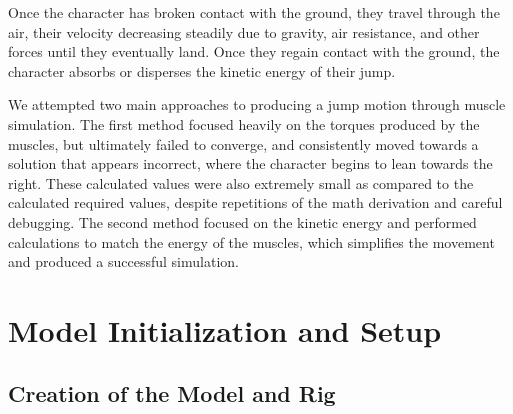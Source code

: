 Once the character has broken contact with the ground, they travel through the air, their velocity decreasing steadily due to gravity, air resistance, and other forces until they eventually land.  Once they regain contact with the ground, the character absorbs or disperses the kinetic energy of their jump.

We attempted two main approaches to producing a jump motion through muscle simulation.  The first method focused heavily on the torques produced by the muscles, but ultimately failed to converge, and consistently moved towards a solution that appears incorrect, where the character begins to lean towards the right.  These calculated values were also extremely small as compared to the calculated required values, despite repetitions of the math derivation and careful debugging.  The second method focused on the kinetic energy and performed calculations to match the energy of the muscles, which simplifies the movement and produced a successful simulation.

\section{Model Initialization and Setup}
\label{section:setup_inputs}
\subsection{Creation of the Model and Rig}
\label{subsection:model_rig}


